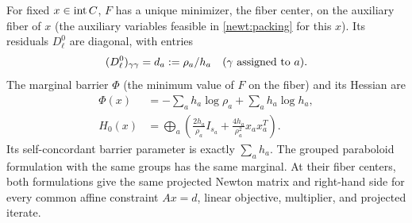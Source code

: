 \begin{proposition}
\label{newt:center}
For fixed $x\in\operatorname{int} C$, $F$ has a unique minimizer, the fiber center,
on the auxiliary fiber of $x$ (the auxiliary variables feasible in
\eqref{newt:packing} for this $x$).  Its residuals $D_\ell^0$ are
diagonal, with entries
\begin{equation}\label{newt:d0}
 (D_\ell^0)_{\gamma\gamma}=d_a:=\rho_a/h_a
       \quad(\gamma\hbox{ assigned to }a).
\end{equation}
The marginal barrier $\Phi$ (the minimum value of $F$ on the fiber) and
its Hessian are
\begin{align}
 \Phi(x)&=-\sum_a h_a\log\rho_a+\sum_a h_a\log h_a,
       \label{newt:marginal}\\
 H_0(x)&=\bigoplus_a\left(
       \frac{2h_a}{\rho_a}I_{s_a}
       +\frac{4h_a}{\rho_a^2}x_ax_a^T\right).
       \label{newt:center-hessian}
\end{align}
Its self-concordant barrier parameter is exactly $\sum_a h_a$.
The grouped paraboloid formulation with the same groups has the same
marginal.  At their fiber centers, both formulations give the same
projected Newton matrix and right-hand side for every common affine
constraint $Ax=d$, linear objective, multiplier, and projected iterate.
\end{proposition}
